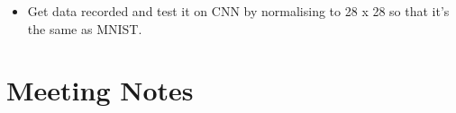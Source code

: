 \documentclass[]{weekly-report}
\begin{document}
\begin{itemize}
\item Get data recorded and test it on CNN by normalising to 28 x 28 so that it's the same as MNIST.

\end{itemize}

\section{Meeting Notes}





{}



\label{last_page}

 
\end{document}
